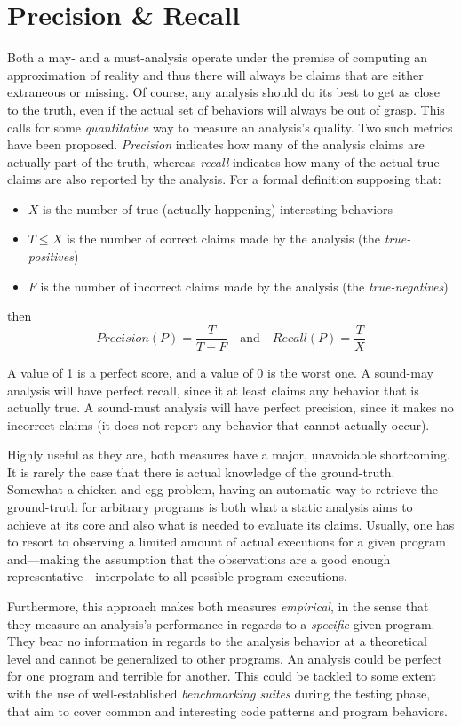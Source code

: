 \section{Precision \& Recall}

Both a may- and a must-analysis operate under the premise of computing an approximation of reality and thus there will always be claims that are either extraneous or missing. Of course, any analysis should do its best to get as close to the truth, even if the actual set of behaviors will always be out of grasp. This calls for some \emph{quantitative} way to measure an analysis's quality. Two such metrics have been proposed. \emph{Precision} indicates how many of the analysis claims are actually part of the truth, whereas \emph{recall} indicates how many of the actual true claims are also reported by the analysis. For a formal definition supposing that:
\begin{itemize}
\item $X$ is the number of true (actually happening) interesting behaviors
\item $T \leq X$ is the number of correct claims made by the analysis (the \emph{true-positives})
\item $F$ is the number of incorrect claims made by the analysis (the \emph{true-negatives})
\end{itemize}
then
\[
Precision(P) = \frac{T}{T + F}
\quad \textrm{and} \quad
Recall(P) = \frac{T}{X}
\]

A value of 1 is a perfect score, and a value of 0 is the worst one. A sound-may analysis will have perfect recall, since it at least claims any behavior that is actually true. A sound-must analysis will have perfect precision, since it makes no incorrect claims (it does not report any behavior that cannot actually occur).

Highly useful as they are, both measures have a major, unavoidable shortcoming. It is rarely the case that there is actual knowledge of the ground-truth. Somewhat a chicken-and-egg problem, having an automatic way to retrieve the ground-truth for arbitrary programs is both what a static analysis aims to achieve at its core and also what is needed to evaluate its claims. Usually, one has to resort to observing a limited amount of actual executions for a given program and---making the assumption that the observations are a good enough representative---interpolate to all possible program executions.

Furthermore, this approach makes both measures \emph{empirical}, in the sense that they measure an analysis's performance in regards to a \emph{specific} given program. They bear no information in regards to the analysis behavior at a theoretical level and cannot be generalized to other programs. An analysis could be perfect for one program and terrible for another. This could be tackled to some extent with the use of well-established \emph{benchmarking suites} during the testing phase, that aim to cover common and interesting code patterns and program behaviors.


